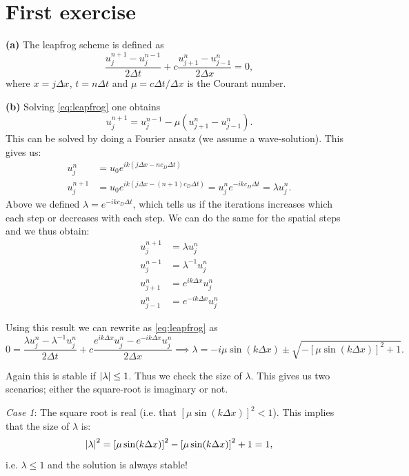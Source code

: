 \section{First exercise}

\textbf{(a)} The leapfrog scheme is defined as 
\begin{equation}
    \frac{u_j^{n+1}-u_j^{n-1}}{2\Delta t} + c \frac{u_{j+1}^n-u_{j-1}^n}{2\Delta x}=0,
    \label{eq:leapfrog} 
\end{equation}
where $x=j\Delta x$, $t=n\Delta t$ and $\mu=c\Delta t/ \Delta x$ is the Courant number. 

\textbf{(b)} Solving \autoref{eq:leapfrog} one obtains 
\begin{equation}
    u_j^{n+1}=u_j^{n-1}-\mu \left(u_{j+1}^n-u_{j-1}^n\right).
\end{equation}
This can be solved by doing a Fourier ansatz (we assume a wave-solution). This gives us:
\begin{align*}
    u_j^n &= u_0 e^{ik\left(j\Delta x-n c_D\Delta t\right)}\\
    u_j^{n+1} &=u_0 e^{ik\left(j\Delta x-(n+1) c_D\Delta t\right)} = u_j^n e^{-ikc_D\Delta t} = \lambda u_j^n.
\end{align*}
Above we defined $\lambda=e^{-ikc_D\Delta t}$, which tells us if the iterations increases which each step or decreases with each step. We can do the same for the spatial steps and we thus obtain:
\begin{align*}
    u_j^{n+1} &= \lambda u_j^n \\ 
    u_j^{n-1} &= \lambda^{-1} u_j^n \\
    u_{j+1}^n &= e^{ik\Delta x} u_j^n \\ 
    u_{j-1}^n &= e^{-ik\Delta x} u_j^n 
\end{align*}

Using this result we can rewrite as \autoref{eq:leapfrog} as 
\begin{equation}
    0= \frac{\lambda u_j^n -\lambda^{-1}u_j^n}{2\Delta t} + c \frac{e^{ik\Delta x} u_j^n- e^{-ik\Delta x} u_j^n}{2\Delta x} \implies \lambda = -i\mu\sin(k\Delta x) \pm \sqrt{-\left[\mu\sin(k\Delta x)\right]^2+1}.
\end{equation}

Again this is stable if $\left| \lambda \right|\leq 1$. Thus we check the size of $\lambda$. This gives us two scenarios; either the square-root is imaginary or not. 

\textit{Case 1}: The square root is real (i.e. that $\left[\mu\sin(k\Delta x)\right]^2<1$). This implies that the size of $\lambda$ is: 
\begin{equation*}
    \left| \lambda \right|^2 = \left[\mu\sin(k\Delta x)\right]^2 - \left[\mu\sin(k\Delta x)\right]^2 +1 = 1,
\end{equation*}
i.e. $\lambda\leq1$ and the solution is always stable! 


